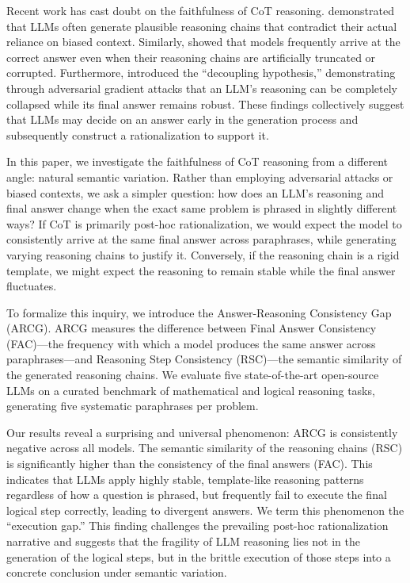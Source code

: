 \documentclass{article} %
\begin{document}
Recent work has cast doubt on the faithfulness of CoT reasoning. \citet{turpin2023languagemodelsdontsay} demonstrated that LLMs often generate plausible reasoning chains that contradict their actual reliance on biased context. Similarly, \citet{lanham2023measuringfaithfulnesschainofthoughtreasoning} showed that models frequently arrive at the correct answer even when their reasoning chains are artificially truncated or corrupted. Furthermore, \citet{Jiang2025RobustAF} introduced the ``decoupling hypothesis,'' demonstrating through adversarial gradient attacks that an LLM's reasoning can be completely collapsed while its final answer remains robust. These findings collectively suggest that LLMs may decide on an answer early in the generation process and subsequently construct a rationalization to support it.

In this paper, we investigate the faithfulness of CoT reasoning from a different angle: natural semantic variation. Rather than employing adversarial attacks or biased contexts, we ask a simpler question: how does an LLM's reasoning and final answer change when the exact same problem is phrased in slightly different ways? If CoT is primarily post-hoc rationalization, we would expect the model to consistently arrive at the same final answer across paraphrases, while generating varying reasoning chains to justify it. Conversely, if the reasoning chain is a rigid template, we might expect the reasoning to remain stable while the final answer fluctuates.

To formalize this inquiry, we introduce the Answer-Reasoning Consistency Gap (ARCG). ARCG measures the difference between Final Answer Consistency (FAC)---the frequency with which a model produces the same answer across paraphrases---and Reasoning Step Consistency (RSC)---the semantic similarity of the generated reasoning chains. We evaluate five state-of-the-art open-source LLMs on a curated benchmark of mathematical and logical reasoning tasks, generating five systematic paraphrases per problem.

Our results reveal a surprising and universal phenomenon: ARCG is consistently negative across all models. The semantic similarity of the reasoning chains (RSC) is significantly higher than the consistency of the final answers (FAC). This indicates that LLMs apply highly stable, template-like reasoning patterns regardless of how a question is phrased, but frequently fail to execute the final logical step correctly, leading to divergent answers. We term this phenomenon the ``execution gap.'' This finding challenges the prevailing post-hoc rationalization narrative and suggests that the fragility of LLM reasoning lies not in the generation of the logical steps, but in the brittle execution of those steps into a concrete conclusion under semantic variation.
\end{document}
